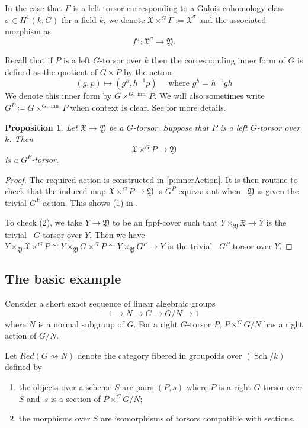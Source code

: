 \documentclass[12pt, final]{amsart}
\theoremstyle{remark}
\theoremstyle{definition}
\theoremstyle{plain}
\newtheorem{proposition}[example]{Proposition}
\newcommand{\rsa}{\rightsquigarrow}
\newcommand{\fX}{{\mathfrak X}}
\newcommand{\fY}{{\mathfrak Y}}
\DeclareMathOperator{\sch}{Sch}
\DeclareMathOperator{\inn}{inn}
\begin{document}
In the case that $F$ is a left torsor corresponding to a Galois cohomology class $\sigma\in H^1(k, G)$ for a field $k$, we denote 
$\fX \times^{G} F:= \fX^\sigma $ and the associated morphism as 
$$
f^{\sigma}: \fX^{\sigma}\to \fY. 
$$


Recall that if $P$ is a left $G$-torsor over $k$ then the corresponding inner form of $G$ is 
defined as the quotient of $G\times P$ by the action 
$$
(g,p)\longmapsto (g^h,h^{-1}p) \quad \text{ where } g^{h}=h^{-1}gh
$$
We denote this inner form by $G\times^{G,\inn} P$. We will also sometimes write 
$G^P \coloneqq G \times^{G,\inn}P$ when context is clear. See  for more details.

\begin{proposition}
    Let $\fX \to \fY$ be a $G$-torsor. Suppose that $P$ is a left $G$-torsor over $k$. Then 
    $$
    \fX\times^{G}P \to \fY 
    $$
    is a $G^P$-torsor. 
\end{proposition}
\begin{proof}
   
    The required action is constructed in \ref{p:innerAction}.
It is then routine to check that the induced map 
    $\fX \times^G P \to \fY$ is $G^P$-equivariant when ~$\fY$ is given the
    trivial $G^P$ action. This shows (1) in .

    To check (2), we take $Y \to \fY$ to be 
    an fppf-cover such that $Y \times_\fY \fX \to Y$ is the trivial 
    ~$G$-torsor over $Y$. Then we have 
    $Y \times_\fY \fX \times^G P \cong Y \times_\fY G \times^G P \cong Y \times_\fY G^P \to Y$
    is the trivial ~$G^P$-torsor over $Y$. 
\end{proof}

\subsection{The basic example}
Consider a short exact sequence of linear algebraic groups
$$
1\to N \to G\to G/N\to 1 
$$ where $N$ is a normal subgroup of $G$.
For a right $G$-torsor $P$, $P\times^{G}G/N$ has a right action of $G/N$.

Let $Red(G\rsa N)$ denote the category fibered in groupoids over $\left(\sch/k\right)$ defined by 
\begin{enumerate}
    \item the objects over a scheme $S$ are pairs $(P,s)$ where $P$ is a right $G$-torsor over $S$ and~$s$ is a section of $P\times^{G}G/N$; 
    \item the morphisms over $S$ are isomorphisms of torsors compatible with sections. 
\end{enumerate}
\end{document}
